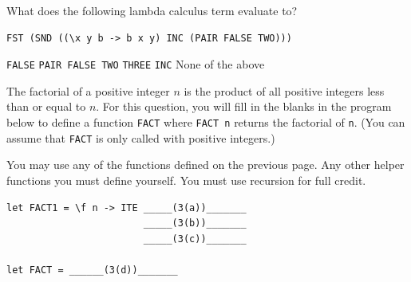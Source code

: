 \documentclass[addpoints]{exam}
\begin{document}
\begin{questions}
\question[5] What does the following lambda calculus term evaluate to?

\begin{verbatim}
FST (SND ((\x y b -> b x y) INC (PAIR FALSE TWO)))
\end{verbatim}

\begin{choices}
\CorrectChoice \texttt{FALSE}
\choice \texttt{PAIR FALSE TWO}
\choice \texttt{THREE}
\choice \texttt{INC}
\choice None of the above
\end{choices}

\newpage
  
\question The factorial of a positive integer $n$ is the product of all positive integers less than or equal to $n$.  For this question, you will fill in the blanks in the program below to define a function \verb|FACT| where \verb|FACT n| returns the factorial of \verb|n|.  (You can assume that \verb|FACT| is only called with positive integers.)

You may use any of the functions defined on the previous page.  Any other helper functions you must define yourself.  You must use recursion for full credit.

\begin{verbatim}
let FACT1 = \f n -> ITE _____(3(a))_______
                        _____(3(b))_______
                        _____(3(c))_______
                      
let FACT = ______(3(d))_______
\end{verbatim}

\end{questions}
\end{document}
